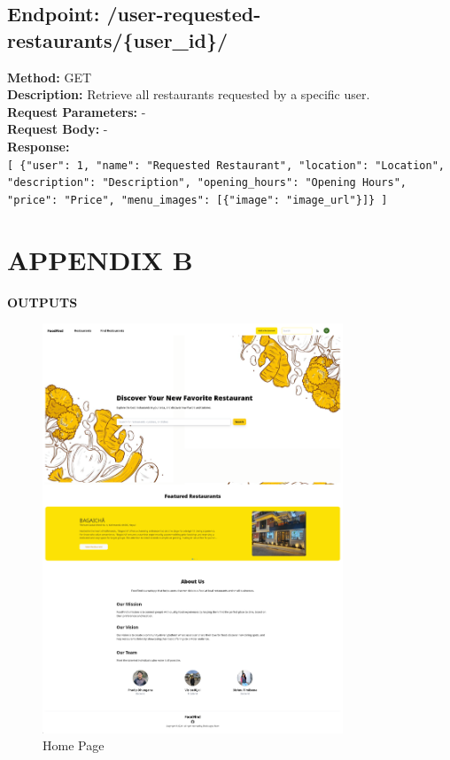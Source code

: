 \documentclass[12pt, a4paper, oneside]{article}
\begin{document}
\subsection*{Endpoint: /user-requested-restaurants/\{user_id\}/}
\textbf{Method:} GET \\
\textbf{Description:} Retrieve all restaurants requested by a specific user. \\
\textbf{Request Parameters:} - \\
\textbf{Request Body:} - \\
\textbf{Response:} \\
\texttt{[ \{"user": 1, "name": "Requested Restaurant", "location": "Location", "description": "Description", "opening\_hours": "Opening Hours", "price": "Price", "menu\_images": [\{"image": "image\_url"\}]\} ]}



\pagebreak


\section*{APPENDIX B}
\appendix   
\textbf{\Large OUTPUTS}

\begin{figure}[h]
	\includegraphics[width=0.8\textwidth]{home}
	\centering
	\caption{Home Page}
	\label{fig:Home Page}
\end{figure}
\end{document}
